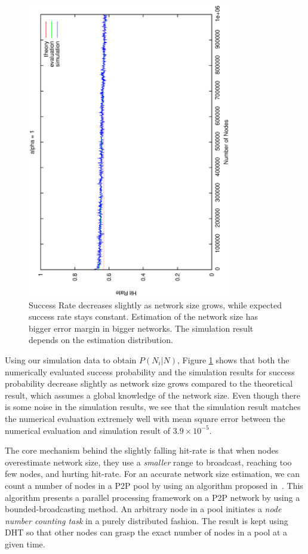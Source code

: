 \documentclass[9.5pt,journal,final,finalsubmission,twocolumn]{IEEEtran}
\begin{document}
\begin{figure}
\centering
\includegraphics[angle=270,width=3.5in]{evaluation}
\caption{Success Rate decreases slightly as network size grows, 
while expected success rate stays constant. 
Estimation of the network size has bigger error margin in bigger 
networks. The simulation result depends on the estimation distribution.} 
\label{fig:anal}
\end{figure}
Using our simulation data to obtain $P(N_i|N)$,
Figure \ref{fig:anal} shows that both the numerically evaluated success probability
and the simulation results for success probability decrease slightly 
as network size grows compared to the theoretical result, which assumes a global
knowledge of the network size. Even though there is some noise in the 
simulation results, we see that
the simulation result matches the numerical evaluation extremely well
with mean square error between the numerical evaluation and 
simulation result of $3.9\times 10^{-5}$.

The core mechanism behind the slightly falling hit-rate is that
when nodes overestimate network size, they use a \emph{smaller} range
to broadcast, reaching too few nodes, and hurting hit-rate.
For an accurate network size estimation, we can count a number of nodes
in a P2P pool by using an algorithm proposed in~\cite{mapreduce-p2p}. This algorithm presents
a parallel processing framework on a P2P network by using a bounded-broadcasting method.
An arbitrary node in a pool initiates a \textit{node number counting task}
in a purely distributed fashion. The result is kept using DHT 
so that other nodes can grasp the exact number of nodes in a pool at a given time. 
\end{document}
